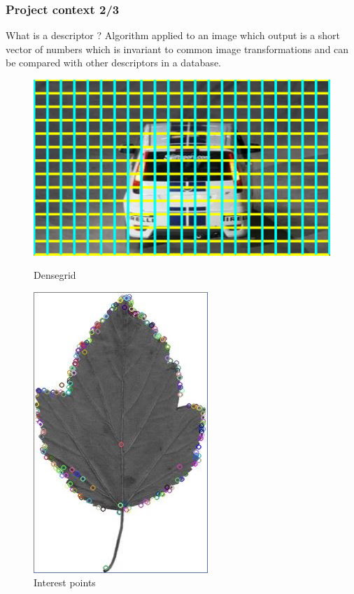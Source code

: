 \documentclass[xcolor=table]{beamer}
\begin{document}
\begin{frame} \frametitle{Project context 2/3}
\begin{block}{What is a descriptor ?}
	Algorithm applied to an image which output is a short vector
	of numbers which is invariant to common image transformations
	and can be compared with other descriptors in a	database.
\end{block}


\begin{figure}
   \begin{minipage}[c]{.56\linewidth}
      \includegraphics[scale=0.40]{dense_grid.png}
	  \caption{Densegrid}
   \end{minipage} \hfill
   \begin{minipage}[c]{.34\linewidth}
      \includegraphics[scale=0.27]{siftKP.jpg}
	  \caption{Interest points}
   \end{minipage}
\end{figure}





\end{frame}
\end{document}
